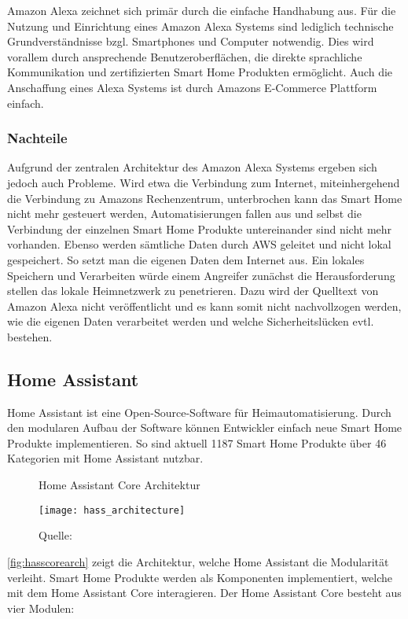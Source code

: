 Amazon Alexa zeichnet sich primär durch die einfache Handhabung aus.
Für die Nutzung und Einrichtung eines Amazon Alexa Systems sind lediglich technische Grundverständnisse bzgl. Smartphones und Computer notwendig.
Dies wird vorallem durch ansprechende Benutzeroberflächen, die direkte sprachliche Kommunikation und zertifizierten Smart Home Produkten ermöglicht.
Auch die Anschaffung eines Alexa Systems ist durch Amazons E-Commerce Plattform einfach.

\subsubsection{Nachteile}

Aufgrund der zentralen Architektur des Amazon Alexa Systems ergeben sich jedoch auch Probleme.
Wird etwa die Verbindung zum Internet, miteinhergehend die Verbindung zu Amazons Rechenzentrum, unterbrochen kann das Smart Home nicht mehr gesteuert werden, Automatisierungen fallen aus und selbst die Verbindung der einzelnen Smart Home Produkte untereinander sind nicht mehr vorhanden.
Ebenso werden sämtliche Daten durch \ac{AWS} geleitet und nicht lokal gespeichert.
So setzt man die eigenen Daten dem Internet aus.
Ein lokales Speichern und Verarbeiten würde einem Angreifer zunächst die Herausforderung stellen das lokale Heimnetzwerk zu penetrieren.
Dazu wird der Quelltext von Amazon Alexa nicht veröffentlicht und es kann somit nicht nachvollzogen werden, wie die eigenen Daten verarbeitet werden und welche Sicherheitslücken evtl. bestehen.

\subsection{Home Assistant}

Home Assistant ist eine Open-Source-Software für Heimautomatisierung.
Durch den modularen Aufbau der Software können Entwickler einfach neue Smart Home Produkte implementieren.
So sind aktuell 1187 Smart Home Produkte über 46 Kategorien mit Home Assistant nutzbar.

\begin{figure}[ht]
	\centering
	\caption{Home Assistant Core Architektur}
	\texttt{[image: hass\_architecture]}
	\caption*{\footnotesize{Quelle: }}
	\label{fig:hasscorearch}
\end{figure}

\autoref{fig:hasscorearch} zeigt die Architektur, welche Home Assistant die Modularität verleiht.
Smart Home Produkte werden als Komponenten implementiert, welche mit dem Home Assistant Core interagieren.
Der Home Assistant Core besteht aus vier Modulen:

